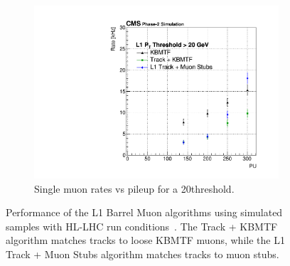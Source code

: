 \begin{figure} [htb!]
\begin{subfigure}[h]{0.45\linewidth}
		\includegraphics[width=\linewidth]{figs/04_muons/rateVsPU_TPS.pdf}
		\caption{Single muon rates vs pileup for a 20\GeV threshold.}
		\label{}
	\end{subfigure}
	\caption[Performance of the L1 Barrel Muon algorithms using simulated samples with HL-LHC run conditions. The Track + KBMTF algorithm matches tracks to loose KBMTF muons, while the L1 Track + Muon Stubs algorithm matches tracks to muon stubs.]{Performance of the L1 Barrel Muon algorithms using simulated samples with HL-LHC run conditions~\cite{CERN-LHCC-2020-004}. The Track + KBMTF algorithm matches tracks to loose KBMTF muons, while the L1 Track + Muon Stubs algorithm matches tracks to muon stubs.}
	\label{fig:rate_eff_HLLHC}
\end{figure}